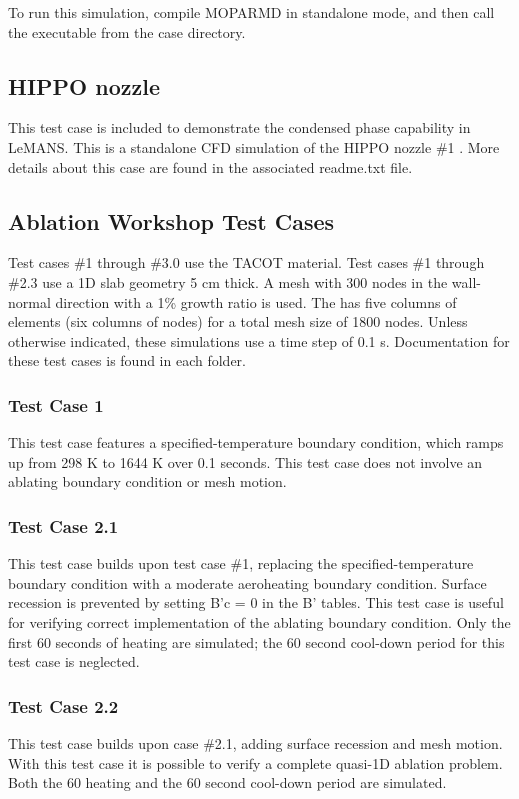 \documentclass[]{article}
\begin{document}
To run this simulation, compile MOPARMD in standalone mode, and then call the executable from the case directory.

\subsection{HIPPO nozzle}
This test case is included to demonstrate the condensed phase capability in LeMANS.  This is a standalone CFD simulation of the HIPPO nozzle \#1 \cite{hippo}.  More details about this case are found in the associated readme.txt file.

\subsection{Ablation Workshop Test Cases}

Test cases \#1 through \#3.0 use the TACOT material. Test cases \#1 through \#2.3 use a 1D slab geometry 5 cm thick. A mesh with 300 nodes in the wall-normal direction with a 1\% growth ratio is used. The has five columns of elements (six columns of nodes) for a total mesh size of 1800 nodes. Unless otherwise indicated, these simulations use a time step of 0.1 s.  Documentation for these test cases is found in each folder.

\subsubsection{Test Case 1}
This test case features a specified-temperature boundary condition, which ramps up from 298 K to 1644 K over 0.1 seconds. This test case does not involve an ablating boundary condition or mesh motion.

\subsubsection{Test Case 2.1}
This test case builds upon test case \#1, replacing the specified-temperature boundary condition with a moderate aeroheating boundary condition. Surface recession is prevented by setting B’c = 0 in the B’ tables. This test case is useful for verifying correct implementation of the ablating boundary condition. Only the first 60 seconds of heating are simulated; the 60 second cool-down period for this test case is neglected.

\subsubsection{Test Case 2.2}
This test case builds upon case \#2.1, adding surface recession and mesh motion. With this test case it is possible to verify a complete quasi-1D ablation problem. Both the 60 heating and the 60 second cool-down period are simulated.
\end{document}
